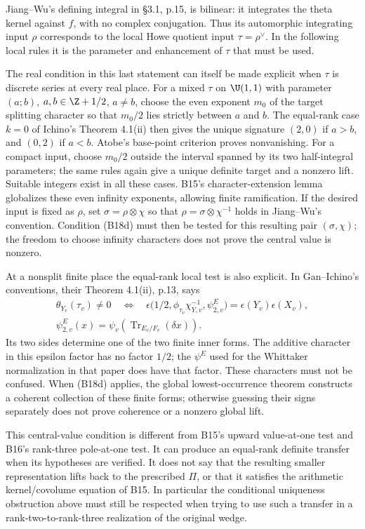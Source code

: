 Jiang--Wu's defining integral in \S3.1, p.15, is bilinear:
it integrates the theta kernel against $f$, with no complex
conjugation. Thus its automorphic integrating input $\rho$
corresponds to the local Howe quotient input
$\tau=\rho^\vee$. In the following local rules it is the
parameter and enhancement of $\tau$ that must be used.

The real condition in this last statement can itself be made
explicit when $\tau$ is discrete series at every real place.
For a mixed $\tau$ on $\U(1,1)$ with parameter $(a;b)$,
$a,b\in\Z+1/2$, $a\ne b$, choose the even exponent $m_0$ of
the target splitting character so that $m_0/2$ lies strictly
between $a$ and $b$. The equal-rank case $k=0$ of Ichino's
Theorem 4.1(ii) then gives the unique signature $(2,0)$ if
$a>b$, and $(0,2)$ if $a<b$. Atobe's base-point criterion
proves nonvanishing. For a compact input, choose $m_0/2$
outside the interval spanned by its two half-integral parameters;
the same rules again give a unique definite target and a
nonzero lift. Suitable integers exist in all these cases.
B15's character-extension lemma globalizes these even infinity
exponents, allowing finite ramification. If the desired input
is fixed as $\rho$, set $\sigma=\rho\otimes\chi$ so that
$\rho=\sigma\otimes\chi^{-1}$ holds in Jiang--Wu's convention.
Condition (B18d) must then be tested for this resulting pair
$(\sigma,\chi)$; the freedom to choose infinity characters
does not prove the central value is nonzero.

At a nonsplit finite place the equal-rank local test is also
explicit. In Gan--Ichino's conventions, their Theorem 4.1(ii),
p.13, says
\[
 \begin{gathered}
 \theta_{Y_v}(\tau_v)\ne0
 \quad\Longleftrightarrow\quad
 \epsilon\bigl(1/2,\phi_{\tau_v}\chi_{Y,v}^{-1},
                      \psi_{2,v}^E\bigr)
               =\epsilon(Y_v)\epsilon(X_v),\\
 \psi_{2,v}^E(x)=\psi_v(\operatorname{Tr}_{E_v/F_v}(\delta x)).
 \end{gathered}
 \tag{B18e}
\]
Its two sides determine one of the two finite inner forms.
The additive character in this epsilon factor has no factor
$1/2$; the $\psi^E$ used for the Whittaker normalization in
that paper does have that factor. These characters must not be
confused. When (B18d) applies, the global lowest-occurrence
theorem constructs a coherent collection of these finite forms;
otherwise guessing their signs separately does not prove
coherence or a nonzero global lift.

This central-value condition is different from B15's upward
value-at-one test and B16's rank-three pole-at-one test. It can
produce an equal-rank definite transfer when its hypotheses are
verified. It does not say that the resulting smaller
representation lifts back to the prescribed $\Pi$, or that it
satisfies the arithmetic kernel/covolume equation of B15.
In particular the conditional uniqueness obstruction above
must still be respected when trying to use such a transfer in
a rank-two-to-rank-three realization of the original wedge.
